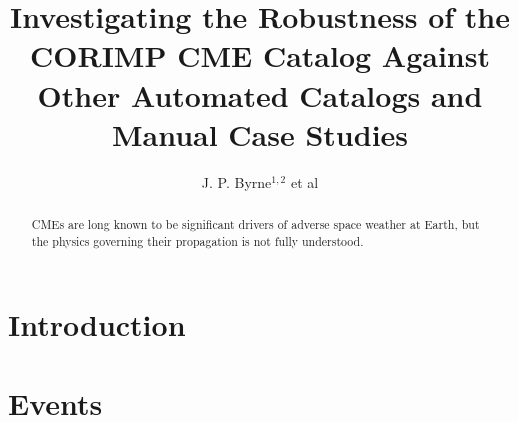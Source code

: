 \documentclass[preprint2]{aastex}
\begin{document}
\title{Investigating the Robustness of the CORIMP CME Catalog Against Other Automated Catalogs and Manual Case Studies} %

\author{J. P. Byrne$^{1,2}$ et al}%


\begin{abstract}

CMEs are long known to be significant drivers of adverse space weather at Earth, but the physics governing their propagation is not fully understood. 

\end{abstract}



\section{Introduction}


\section{Events}
\end{document}
